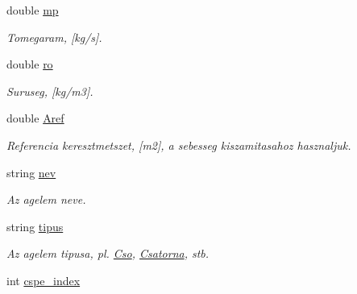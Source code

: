\begin{DoxyCompactItemize}
\item 
double \hyperlink{class_agelem_a1377d80d8511cc4adacccba31d28282d}{mp}\hypertarget{class_agelem_a1377d80d8511cc4adacccba31d28282d}{}\label{class_agelem_a1377d80d8511cc4adacccba31d28282d}

\begin{DoxyCompactList}\small\item\em Tomegaram, \mbox{[}kg/s\mbox{]}. \end{DoxyCompactList}\item 
double \hyperlink{class_agelem_a520072191e53f368a04ca80b8b583a3f}{ro}\hypertarget{class_agelem_a520072191e53f368a04ca80b8b583a3f}{}\label{class_agelem_a520072191e53f368a04ca80b8b583a3f}

\begin{DoxyCompactList}\small\item\em Suruseg, \mbox{[}kg/m3\mbox{]}. \end{DoxyCompactList}\item 
double \hyperlink{class_agelem_a3f8668febc2958fd539997d537552f17}{Aref}\hypertarget{class_agelem_a3f8668febc2958fd539997d537552f17}{}\label{class_agelem_a3f8668febc2958fd539997d537552f17}

\begin{DoxyCompactList}\small\item\em Referencia keresztmetszet, \mbox{[}m2\mbox{]}, a sebesseg kiszamitasahoz hasznaljuk. \end{DoxyCompactList}\item 
string \hyperlink{class_agelem_abe92b7e3912367d5d1caf6b277ca0b7d}{nev}\hypertarget{class_agelem_abe92b7e3912367d5d1caf6b277ca0b7d}{}\label{class_agelem_abe92b7e3912367d5d1caf6b277ca0b7d}

\begin{DoxyCompactList}\small\item\em Az agelem neve. \end{DoxyCompactList}\item 
string \hyperlink{class_agelem_a6e1c3128174609a0dd8fbee09c0d9162}{tipus}\hypertarget{class_agelem_a6e1c3128174609a0dd8fbee09c0d9162}{}\label{class_agelem_a6e1c3128174609a0dd8fbee09c0d9162}

\begin{DoxyCompactList}\small\item\em Az agelem tipusa, pl. \hyperlink{class_cso}{Cso}, \hyperlink{class_csatorna}{Csatorna}, stb. \end{DoxyCompactList}\item 
int \hyperlink{class_agelem_a9639c0a7a0165b644d62033e24eb6d24}{cspe\+\_\+index}\hypertarget{class_agelem_a9639c0a7a0165b644d62033e24eb6d24}{}\label{class_agelem_a9639c0a7a0165b644d62033e24eb6d24}


\end{DoxyCompactItemize}
